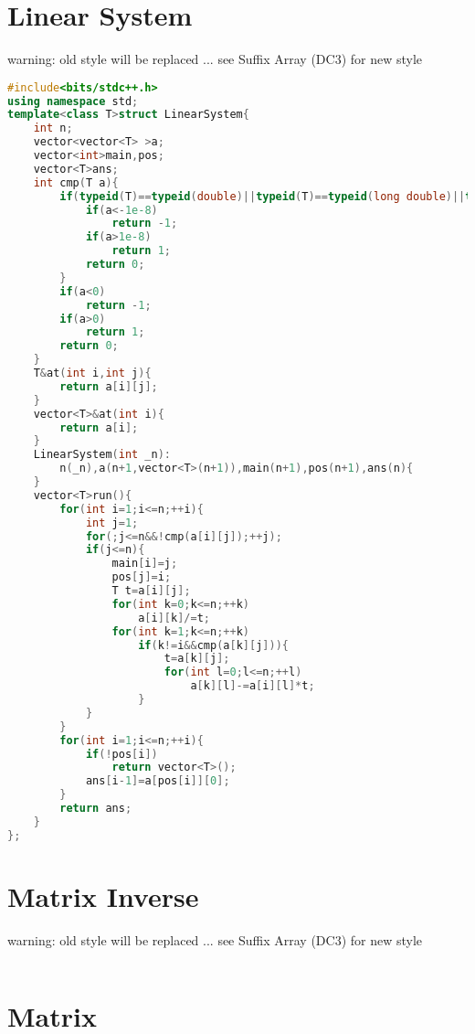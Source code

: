 \documentclass{book}
\begin{document}
\section{Linear System}
warning: old style will be replaced ... see Suffix Array (DC3) for new style\begin{lstlisting}[language=C++,title={Linear System.hpp (1477 bytes, 56 lines)}]
#include<bits/stdc++.h>
using namespace std;
template<class T>struct LinearSystem{
    int n;
    vector<vector<T> >a;
    vector<int>main,pos;
    vector<T>ans;
    int cmp(T a){
        if(typeid(T)==typeid(double)||typeid(T)==typeid(long double)||typeid(T)==typeid(float)){
            if(a<-1e-8)
                return -1;
            if(a>1e-8)
                return 1;
            return 0;
        }
        if(a<0)
            return -1;
        if(a>0)
            return 1;
        return 0;
    }
    T&at(int i,int j){
        return a[i][j];
    }
    vector<T>&at(int i){
        return a[i];
    }
    LinearSystem(int _n):
        n(_n),a(n+1,vector<T>(n+1)),main(n+1),pos(n+1),ans(n){
    }
    vector<T>run(){
        for(int i=1;i<=n;++i){
            int j=1;
            for(;j<=n&&!cmp(a[i][j]);++j);
            if(j<=n){
                main[i]=j;
                pos[j]=i;
                T t=a[i][j];
                for(int k=0;k<=n;++k)
                    a[i][k]/=t;
                for(int k=1;k<=n;++k)
                    if(k!=i&&cmp(a[k][j])){
                        t=a[k][j];
                        for(int l=0;l<=n;++l)
                            a[k][l]-=a[i][l]*t;
                    }
            }
        }
        for(int i=1;i<=n;++i){
            if(!pos[i])
                return vector<T>();
            ans[i-1]=a[pos[i]][0];
        }
        return ans;
    }
};
\end{lstlisting}
\section{Matrix Inverse}
warning: old style will be replaced ... see Suffix Array (DC3) for new style\begin{lstlisting}[language=C++,title={Matrix Inverse.hpp (0 bytes, 0 lines)}]
\end{lstlisting}
\section{Matrix}
\end{document}
